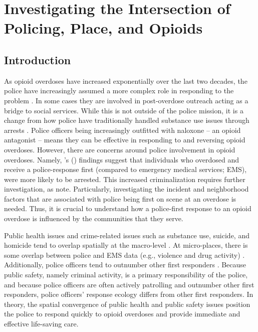 \chapter{Investigating the Intersection of Policing, Place, and Opioids}

\section{\centering Introduction}
As opioid overdoses have increased exponentially over the last two decades, the police have increasingly assumed a more complex role in responding to the problem \parencite{quinn_most_2019, ray_national_2023}. In some cases they are involved in post-overdose outreach \parencite{formica_characteristics_2021,ray_national_2023} acting as a bridge to social services. While this is not outside of the police mission, it is a change from how police have traditionally handled substance use issues through arrests \parencite{cooper_war_2015}. Police officers being increasingly outfitted with naloxone -- an opioid antagonist -- means they can be effective in responding to and reversing opioid overdoses. However, there are concerns around police involvement in opioid overdoses. Namely, \citeauthor{lowder_twoyear_2020}'s (\citeyear{lowder_twoyear_2020}) findings suggest that individuals who overdosed and receive a police-response first (compared to emergency medical services; EMS), were more likely to be arrested. This increased criminalization requires further investigation, as \textcite{lowder_twoyear_2020} note. Particularly, investigating the incident and neighborhood factors that are associated with police being first on scene at an overdose is needed. Thus, it is crucial to understand how a police-first response to an opioid overdose is influenced by the communities that they serve.

Public health issues and crime-related issues such as substance use, suicide, and homicide tend to overlap spatially at the macro-level \parencite{feldmeyer_community_2022}. At micro-places, there is some overlap between police and EMS data (e.g., violence and drug activity) \parencite{hibdon_use_2024}. Additionally, police officers tend to outnumber other first responders \parencite{lurigio_opioid_2018}. Because public safety, namely criminal activity, is a primary responsibility of the police, and because police officers are often actively patrolling and outnumber other first responders, police officers' response ecology differs from other first responders. In theory, the spatial convergence of public health and public safety issues position the police to respond quickly to opioid overdoses and provide immediate and effective life-saving care.

